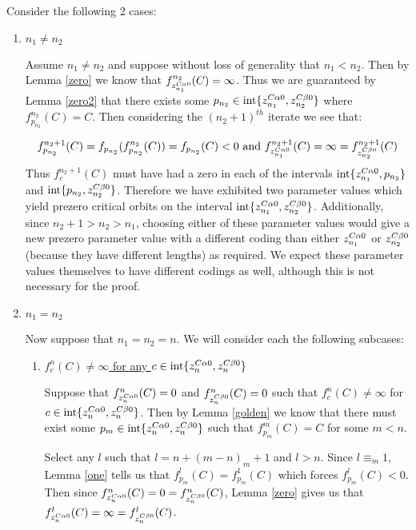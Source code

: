 		\begin{myproof}
		Consider the following 2 cases:

		\begin{enumerate}
		\item \underline{$n_1 \neq n_2$}

		Assume $n_1 \neq n_2$ and suppose without loss of generality that $n_1 < n_2$. Then by Lemma \ref{zero} we know that $f^{n_2}_{z_{n_1}^{C\alpha 0}} (C) = \infty$. Thus we are guaranteed by Lemma \ref{zero2} that there exists some $p_{n_2} \in \text{int}\{z_{n_1}^{C\alpha 0},z_{n_2}^{C\beta 0}\}$ where $f^{n_2}_{p_{n_2}} (C) = C$. Then considering the $ (n_2+1)^{th}$ iterate we see that:
		
		\[
		f^{n_2 + 1}_{p_{n_2}} (C) = f_{p_{n_2}} (f^{n_2}_{p_{n_2}} (C)) = f_{p_{n_2}} (C) < 0 \text{ and } f^{n_2 + 1}_{z_{n_1}^{C\alpha 0}} (C) = \infty = f^{n_2 + 1}_{z_{n_2}^{C\beta 0}} (C)
		\]
		Thus $f^{n_2 + 1 }_{c} (C)$ must have had a zero in each of the intervals $\text{int}\{z_{n_1}^{C\alpha 0},p_{n_2}\}$ and $\text{int}\{p_{n_2},z_{n_2}^{C\beta 0}\}$. Therefore we have exhibited two parameter values which yield prezero critical orbits on the interval $\text{int}\{z_{n_1}^{C\alpha 0},z_{n_2}^{C\beta 0}\}$. Additionally, since $n_2 + 1 > n_2 > n_1$, choosing either of these parameter values would give a new prezero parameter value with a different coding than either $z_{n_1}^{C\alpha 0}$ or $z_{n_2}^{C\beta 0}$ (because they have different lengths) as required. We expect these parameter values themselves to have different codings as well, although this is not necessary for the proof.

		\item \underline{$n_1 = n_2$}

		Now suppose that $n_1 = n_2 = n$. We will consider each the following subcases:

		\begin{enumerate}

		\item \underline{$f^n_c(C) \neq \infty$ for any $c \in \text{int}\{z_n^{C\alpha 0},z_n^{C\beta 0}\}$}

			Suppose that $f^{n}_{z_n^{C\alpha 0}} (C)= 0$ and $f^{n}_{z_n^{C\beta 0}} (C) = 0$ such that $f^n_{c} (C) \neq \infty$ for $c  \in \text{int}\{z_n^{C\alpha 0},z_n^{C\beta 0}\}$. Then by Lemma \ref{golden} we know that there must exist some $p_m \in \text{int}\{z_n^{C\alpha 0},z_n^{C\beta 0}\}$ such that $f^m_{p_m} (C) = C$ for some $m < n$. 

			Select any $l$ such that $l = n + (m - n)_m + 1$ and $l > n$. Since $l \equiv_m 1$, Lemma \ref{one} tells us that $f^l_{p_m} (C) = f^1_{p_m} (C)$ which forces $f^l_{p_m} (C) < 0$. Then since $f^n_{z_n^{C\alpha 0}} (C) = 0 = f^n_{z_n^{C\beta 0}} (C)$, Lemma \ref{zero} gives us that $f^l_{z_n^{C\alpha 0}} (C) = \infty = f^l_{z_n^{C\beta 0}} (C)$. 


\end{enumerate}
\end{enumerate}
\end{myproof}
